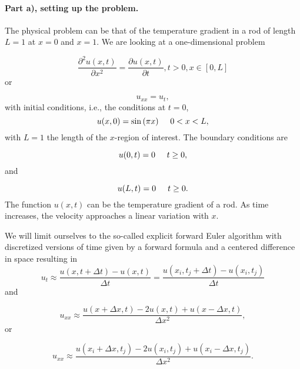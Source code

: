 \documentclass[%
oneside,                 %
final,                   %
10pt]{article}
\begin{document}
\paragraph{Part a), setting up the problem.}
The physical problem can be that of the temperature gradient in a rod of length $L=1$ at $x=0$ and $x=1$.
We are looking at a one-dimensional
problem

\begin{equation*}
 \frac{\partial^2 u(x,t)}{\partial x^2} =\frac{\partial u(x,t)}{\partial t}, t> 0, x\in [0,L]
\end{equation*}
or

\begin{equation*}
u_{xx} = u_t,
\end{equation*}
with initial conditions, i.e., the conditions at $t=0$,
\begin{equation*}
u(x,0)= \sin{(\pi x)} \hspace{0.5cm} 0 < x < L,
\end{equation*}
with $L=1$ the length of the $x$-region of interest. The 
boundary conditions are

\begin{equation*}
u(0,t)= 0 \hspace{0.5cm} t \ge 0,
\end{equation*}
and

\begin{equation*}
u(L,t)= 0 \hspace{0.5cm} t \ge 0.
\end{equation*}
The function $u(x,t)$  can be the temperature gradient of a  rod.
As time increases, the velocity approaches a linear variation with $x$. 

We will limit ourselves to the so-called explicit forward Euler algorithm with discretized versions of time given by a forward formula and a centered difference in space resulting in   
\begin{equation*} 
u_t\approx \frac{u(x,t+\Delta t)-u(x,t)}{\Delta t}=\frac{u(x_i,t_j+\Delta t)-u(x_i,t_j)}{\Delta t}
\end{equation*}
and

\begin{equation*}
u_{xx}\approx \frac{u(x+\Delta x,t)-2u(x,t)+u(x-\Delta x,t)}{\Delta x^2},
\end{equation*}
or

\begin{equation*}
u_{xx}\approx \frac{u(x_i+\Delta x,t_j)-2u(x_i,t_j)+u(x_i-\Delta x,t_j)}{\Delta x^2}.
\end{equation*}
\end{document}
